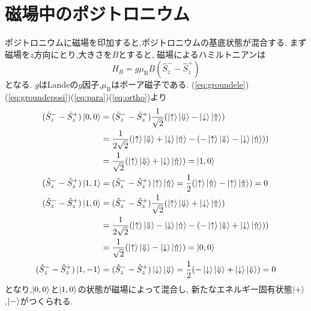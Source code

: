 \section{磁場中のポジトロニウム}
ポジトロニウムに磁場を印加すると,ポジトロニウムの基底状態が混合する.
まず磁場を$z$方向にとり,大きさを$B$とすると,
磁場によるハミルトニアンは
\begin{equation}
	\nonumber
	\hat{H}_{B} = g\mu_{\mathrm{B}}B(\hat{S}^{-}_{z} - \hat{S}^{+}_{z})
\end{equation}
となる.
$g$はLandeの$g$因子,$\mu_{\mathrm{B}}$はボーア磁子である.%
(\ref{eq:groundele})(\ref{eq:groundeposi})(\ref{eq:para})(\ref{eq:ortho})より
\begin{align}
	\nonumber
(\hat{S}^{-}_{z} - \hat{S}^{+}_{z})\ket{0,0} &= (\hat{S}^{-}_{z} - \hat{S}^{+}_{z})\frac{1}{\sqrt{2}} ( \ket{ \uparrow } \ket{ \Downarrow } - \ket{ \downarrow } \ket{ \Uparrow }) \notag \\
&= \frac{1}{2\sqrt{2}} ( \ket{ \uparrow } \ket{ \Downarrow } + \ket{ \downarrow } \ket{ \Uparrow } - ( - \ket{ \uparrow } \ket{ \Downarrow } - \ket{ \downarrow } \ket{ \Uparrow } )) \notag \\
&= \frac{1}{\sqrt{2}} ( \ket{ \uparrow } \ket{ \Downarrow } + \ket{ \downarrow } \ket{ \Uparrow }) = \ket{1,0} \\
(\hat{S}^{-}_{z} - \hat{S}^{+}_{z})\ket{1,1}
&= (\hat{S}^{-}_{z} - \hat{S}^{+}_{z})\ket{ \uparrow } \ket{ \Uparrow }
=\frac{1}{2}( \ket{ \uparrow } \ket{ \Uparrow } - \ket{ \uparrow } \ket{ \Uparrow } )
= 0 \\
(\hat{S}^{-}_{z} - \hat{S}^{+}_{z})\ket{1,0} &= (\hat{S}^{-}_{z} - \hat{S}^{+}_{z})\frac{1}{\sqrt{2}} ( \ket{ \uparrow } \ket{ \Downarrow } + \ket{ \downarrow } \ket{ \Uparrow }) \notag \\
&= \frac{1}{2\sqrt{2}} ( \ket{ \uparrow } \ket{ \Downarrow } - \ket{ \downarrow } \ket{ \Uparrow } - ( - \ket{ \uparrow } \ket{ \Downarrow } + \ket{ \downarrow } \ket{ \Uparrow } )) \notag \\
&= \frac{1}{\sqrt{2}} ( \ket{ \uparrow } \ket{ \Downarrow } - \ket{ \downarrow } \ket{ \Uparrow }) = \ket{0,0} \\
(\hat{S}^{-}_{z} - \hat{S}^{+}_{z})\ket{1,-1}
&= (\hat{S}^{-}_{z} - \hat{S}^{+}_{z})\ket{ \downarrow } \ket{ \Downarrow }
=\frac{1}{2}( - \ket{ \downarrow } \ket{ \Downarrow } + \ket{ \downarrow } \ket{ \Downarrow } )
= 0
\end{align}
となり,$\ket{0,0}$と$\ket{1,0}$の状態が磁場によって混合し,
新たなエネルギー固有状態$\ket{+}$,$\ket{-}$がつくられる.
